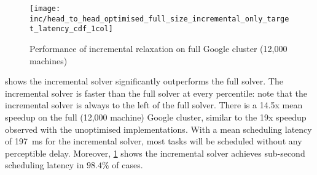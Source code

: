 %

\begin{figure}
    \texttt{[image: inc/head\_to\_head\_optimised\_full\_size\_incremental\_only\_target\_latency\_cdf\_1col]}
    \caption{Performance of incremental relaxation on full Google cluster (12,000 machines)}
    \label{fig:inc-head-to-head-optimised-inconly}
\end{figure}

 shows the incremental solver significantly outperforms the full solver. The incremental solver is faster than the full solver at every percentile: note that the incremental solver is always to the left of the full solver. There is a 14.5x mean speedup on the full (12,000 machine) Google cluster, similar to the 19x speedup observed with the unoptimised implementations\footnotemark. With a mean scheduling latency of \SI{197}{\milli\second} for the incremental solver, most tasks will be scheduled without any perceptible delay. Moreover, \cref{fig:inc-head-to-head-optimised-inconly} shows the incremental solver achieves sub-second scheduling latency in $98.4\%$ of cases.


